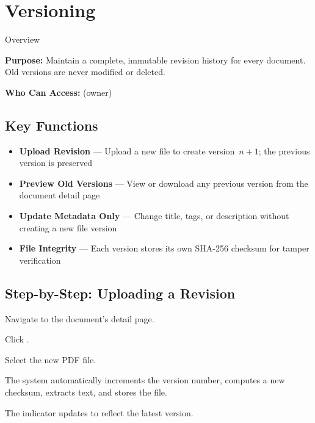 \section{Versioning}

\begin{ugModule}{Overview}

  \textbf{Purpose:}
  Maintain a complete, immutable revision history for every
  document. Old versions are never modified or deleted.

  \textbf{Who Can Access:}
     (owner)
\end{ugModule}

\subsection{Key Functions}
\begin{itemize}[leftmargin=18pt]
  \item \textbf{Upload Revision} --- Upload a new file to
    create version~$n+1$; the previous version is preserved
  \item \textbf{Preview Old Versions} --- View or download
    any previous version from the document detail page
  \item \textbf{Update Metadata Only} --- Change title, tags,
    or description without creating a new file version
  \item \textbf{File Integrity} --- Each version stores its
    own SHA-256 checksum for tamper verification
\end{itemize}

\subsection{Step-by-Step: Uploading a Revision}
\begin{ugSteps}
  \item Navigate to the document's detail page.
  \item Click .
  \item Select the new PDF file.
  \item The system automatically increments the version number,
        computes a new checksum, extracts text, and stores the
        file.
  \item The  indicator updates to
        reflect the latest version.
\end{ugSteps}

